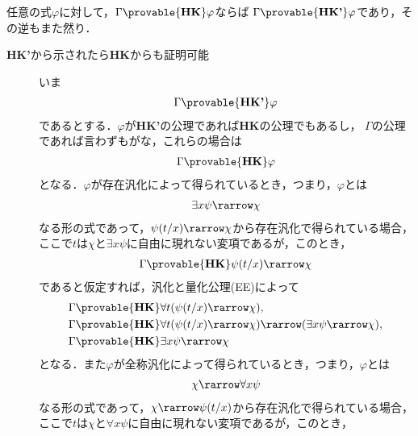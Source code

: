 	\begin{screen}
		\begin{metathm}[{\bf HK}と{\bf HK'}は同値]
			任意の式$\varphi$に対して，$\Gamma \provable{\mbox{{\bf HK}}} \varphi$ならば
			$\Gamma \provable{\mbox{{\bf HK'}}} \varphi$であり，その逆もまた然り．
		\end{metathm}
	\end{screen}
	
	\begin{metaprf}\mbox{}
		\begin{description}
			\item[{\bf HK'}から示されたら{\bf HK}からも証明可能]
			いま
			\begin{align}
				\Gamma \provable{\mbox{{\bf HK'}}} \varphi
			\end{align}
			であるとする．$\varphi$が{\bf HK'}の公理であれば{\bf HK}の公理でもあるし，
			$\Gamma$の公理であれば言わずもがな，これらの場合は
			\begin{align}
				\Gamma \provable{\mbox{{\bf HK}}} \varphi
			\end{align}
			となる．$\varphi$が存在汎化によって得られているとき，つまり，$\varphi$とは
			\begin{align}
				\exists x \psi \rarrow \chi
			\end{align}
			なる形の式であって，$\psi(t/x) \rarrow \chi$から存在汎化で得られている場合，
			ここで$t$は$\chi$と$\exists x \psi$に自由に現れない変項であるが，このとき，
			\begin{align}
				\Gamma \provable{\mbox{{\bf HK}}} \psi(t/x) \rarrow \chi
			\end{align}
			であると仮定すれば，汎化と量化公理(EE)によって
			\begin{align}
				\Gamma &\provable{\mbox{{\bf HK}}} \forall t(\psi(t/x) \rarrow \chi), \\
				\Gamma &\provable{\mbox{{\bf HK}}} \forall t(\psi(t/x) \rarrow \chi)
					\rarrow (\exists x \psi \rarrow \chi), \\
				\Gamma &\provable{\mbox{{\bf HK}}} \exists x \psi \rarrow \chi
			\end{align}
			となる．また$\varphi$が全称汎化によって得られているとき，つまり，$\varphi$とは
			\begin{align}
				\chi \rarrow \forall x \psi
			\end{align}
			なる形の式であって，$\chi \rarrow \psi(t/x)$から存在汎化で得られている場合，
			ここで$t$は$\chi$と$\forall x \psi$に自由に現れない変項であるが，このとき，
			\begin{align}

\end{align}
\end{description}
\end{metaprf}
